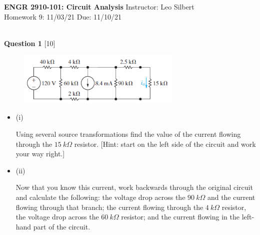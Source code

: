 \documentclass[12pt]{article}
\newcommand{\bit}{\begin{itemize}}
\newcommand{\eit}{\end{itemize}}
\begin{document}

\begin{center}
\hfil
{\large\bf {ENGR 2910-101: Circuit Analysis}}
\hfill Instructor: Leo Silbert \\
Homework 9: 11/03/21 \hfill Due: 11/10/21\\
\hrulefill\\
\end{center}




\noindent
{\bf Question 1} [10]

\begin{figure}[h!]
     \centering
\vspace{-0.1in}
     \includegraphics[clip,width=0.7\textwidth]{Fig4-60.png}
\vspace{-0.15in}
\end{figure}
\bit

\item[(i)]

Using several source transformations find the value of the current flowing through the $15~k\Omega$ resistor. [Hint: start on the left side of the circuit and work your way right.]

\item[(ii)]

Now that you know this current, work backwards through the original circuit and calculate the following: the voltage drop across the $90~k\Omega$ and the current flowing through that branch; the current flowing through the $4~k\Omega$ resistor, the voltage drop across the $60~k\Omega$ resistor; and the current flowing in the left-hand part of the circuit. 

\eit 
\end{document}
